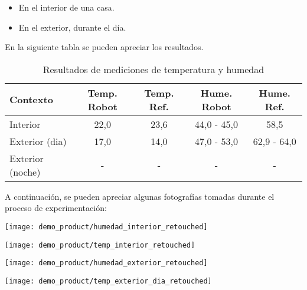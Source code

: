 \begin{itemize}
	\item En el interior de una casa.
	\item En el exterior, durante el día.
\end{itemize}

En la siguiente tabla se pueden apreciar los resultados.

\begin{table}[h]
\centering
\caption[Resultados de mediciones de temperatura y humedad]{Resultados de mediciones de temperatura y humedad}
\begin{tabular}{l c c c c}
\toprule
\textbf{Contexto} & \textbf{Temp. Robot} & \textbf{Temp. Ref.} & \textbf{Hume. Robot}  & \textbf{Hume. Ref.}\\
\midrule
Interior & 22,0 & 23,6 & 44,0 - 45,0 & 58,5 \\
Exterior (dia) & 17,0  & 14,0 & 47,0 - 53,0 & 62,9 - 64,0 \\
Exterior (noche) & - & - & - & - \\
\bottomrule
\hline
\end{tabular}
\end{table}

A continuación, se pueden apreciar algunas fotografías tomadas durante el proceso de experimentación:

\begin{center}
\texttt{[image: demo\_product/humedad\_interior\_retouched]}
  \label{fig:humedad_interior}
\end{center}

\begin{center}
\texttt{[image: demo\_product/temp\_interior\_retouched]}
  \label{fig:humedad_interior}
\end{center}


\begin{center}
\texttt{[image: demo\_product/humedad\_exterior\_retouched]}
  \label{fig:humedad_interior}
\end{center}

\begin{center}
\texttt{[image: demo\_product/temp\_exterior\_dia\_retouched]}
  \label{fig:humedad_interior}
\end{center}

